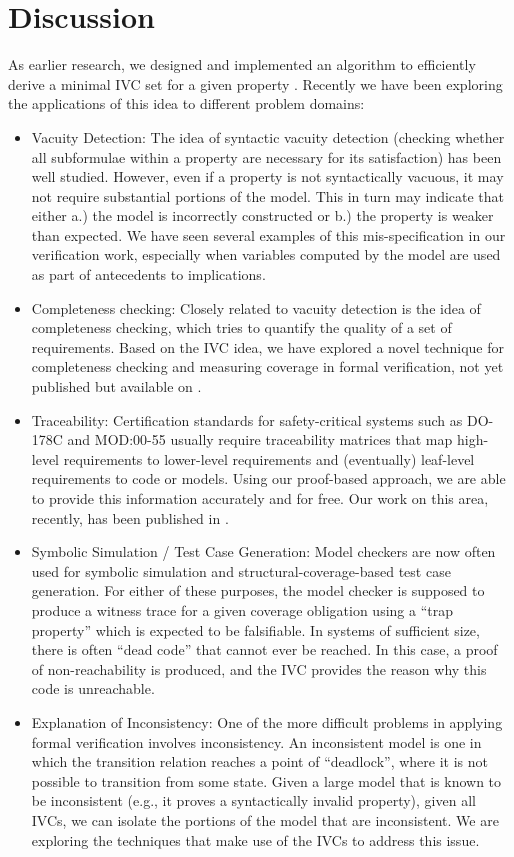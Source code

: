 \section{Discussion}
\label{sec:disc} 	

As earlier research, we designed and implemented an algorithm to efficiently derive a minimal IVC set for a given property \cite{Ghass16}. Recently we have been exploring the applications of this idea to different problem domains:
\begin{itemize}
  \item Vacuity Detection: The idea of syntactic vacuity detection (checking whether all subformulae within a property are necessary for its satisfaction) has been well studied.   However, even if a property is not syntactically vacuous, it may not require substantial portions of the model.  This in turn may indicate that either a.) the model is incorrectly constructed or b.) the property is weaker than expected.  We have seen several examples of this mis-specification in our verification work, especially when variables computed by the model are used as part of antecedents to implications. 
  \item Completeness checking: Closely related to vacuity detection is the idea of completeness checking, which tries to quantify the quality of a set of requirements.  Based on the IVC idea, we have explored a novel technique for completeness checking and measuring coverage in formal verification, not yet published but available on \cite{expr}. 
  \item Traceability: Certification standards for safety-critical systems such as DO-178C and MOD:00-55 usually require traceability matrices that map high-level requirements to lower-level requirements and (eventually) leaf-level requirements to code or models.  Using our proof-based approach, we are able to provide this information accurately and for free. Our work on this area, recently, has been published in \cite{Murugesan16:renext}.
  \item Symbolic Simulation / Test Case Generation:  Model checkers are now often used for symbolic simulation and structural-coverage-based test case generation.  For either of these purposes, the model checker is supposed to produce a witness trace for a given coverage obligation using a ``trap property'' which is expected to be falsifiable.  In systems of sufficient size, there is often ``dead code'' that cannot ever be reached.  In this case, a proof of non-reachability is produced, and the IVC provides the reason why this code is unreachable.
  \item Explanation of Inconsistency: One of the more difficult problems in applying formal verification involves inconsistency.  An inconsistent model is one in which the transition relation reaches a point of “deadlock”, where it is not possible to transition from some state.  Given a large model that is known to be inconsistent (e.g., it proves a syntactically invalid property), given all IVCs, we can isolate the portions of the model that are inconsistent. We are exploring the techniques that make use of the IVCs to address this issue.
\end{itemize}

